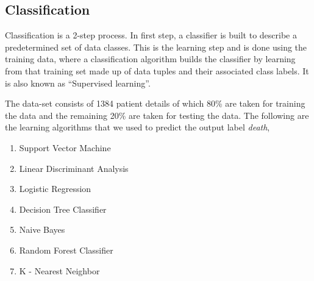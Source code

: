 \documentclass[conference]{IEEEtran}
\begin{document}
\subsection{Classification}
\label{ssec:classification}
Classification is a 2-step process. In first step, a classifier is built to describe a predetermined set of data classes. This is the learning step and is done using the training data, where a classification algorithm builds the classifier by learning from that training set made up of data tuples and their associated class labels. It is also known as “Supervised learning”. 
\par
The data-set consists of 1384 patient details of which 80\% are taken for training the data and the remaining 20\% are taken for testing the data. The following are the learning algorithms that we used to predict the output label \textit{death},
\begin{enumerate}
\item Support Vector Machine
\item Linear Discriminant Analysis
\item Logistic Regression
\item Decision Tree Classifier
\item Naive Bayes
\item Random Forest Classifier
\item K - Nearest Neighbor
\end{enumerate}
\par
\end{document}
